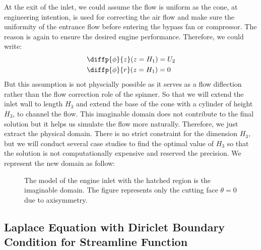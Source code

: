 \documentclass[12pt]{book}
\theoremstyle{bfnote}
\theoremstyle{bfnote}
\begin{document}
At the exit of the inlet, we could assume the flow is uniform as the cone, at engineering intention, is used for correcting the air flow and make sure the uniformity of the entrance flow before entering the bypass fan or compressor. The reason is again to ensure the desired engine performance. Therefore, we could write:
\begin{align}
    & \diffp{\phi}{z}(z = H_1) = U_2 \\
    & \diffp{\phi}{r}(z = H_1) = 0
\end{align}
But this assumption is not physcially possible as it serves as a flow diflection rather than the flow correction role of the spinner. So that we will extend the inlet wall to length $H_3$ and extend the base of the cone with a cylinder of height $H_3$, to channel the flow. This imaginable domain does not contribute to the final solution but it helps us simulate the flow more naturally. Therefore, we just extract the physical domain. There is no strict constraint for the dimension $H_3$, but we will conduct several case studies to find the optimal value of $H_3$ so that the solution is not computationally expensive and reserved the precision. We represent the new domain as follow:
\begin{figure}[h!]
    \centering
    \caption{The model of the engine inlet with the hatched region is the imaginable domain. The figure represents only the cutting face $\theta = 0$ due to axisymmetry.}
    \label{fig:simplified_flow_dom}
\end{figure}

\subsection{Laplace Equation with Diriclet Boundary Condition for Streamline Function} %
\label{subsec:Laplace_Equation_with_Diriclet_Boundary_Condition_for_Streamline_Function}
\end{document}
